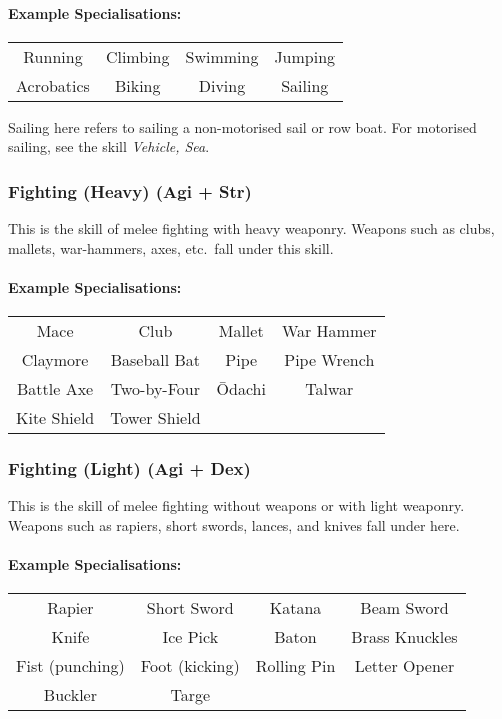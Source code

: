 \paragraph{Example Specialisations:}
\begin{center}
    \begin{tabular}{c|c|c|c}
        Running & Climbing & Swimming & Jumping \\
        Acrobatics & Biking & Diving & Sailing \\
    \end{tabular}
\end{center}

\begin{note} 
    Sailing here refers to sailing a non-motorised sail or row boat. For motorised sailing, see the skill \textit{Vehicle, Sea}.
\end{note}

\subsubsection{Fighting (Heavy) (Agi + Str)}
This is the skill of melee fighting with heavy weaponry. Weapons such as clubs, mallets, war-hammers, axes, etc.\ fall under this skill.

\paragraph{Example Specialisations:}
\begin{center}
    \begin{tabular}{c|c|c|c}
        Mace & Club & Mallet & War Hammer \\
        Claymore & Baseball Bat & Pipe & Pipe Wrench \\
        Battle Axe & Two-by-Four & \= Odachi & Talwar \\
        Kite Shield & Tower Shield \\
    \end{tabular}
\end{center}

\subsubsection{Fighting (Light) (Agi + Dex)}
This is the skill of melee fighting without weapons or with light weaponry. 
Weapons such as rapiers, short swords, lances, and knives fall under here.

\paragraph{Example Specialisations:}
\begin{center}
    \begin{tabular}{c|c|c|c}
        Rapier & Short Sword & Katana & Beam Sword \\
        Knife & Ice Pick & Baton & Brass Knuckles \\
        Fist (punching) & Foot (kicking) & Rolling Pin & Letter Opener \\
        Buckler & Targe\\
    \end{tabular}
\end{center}

